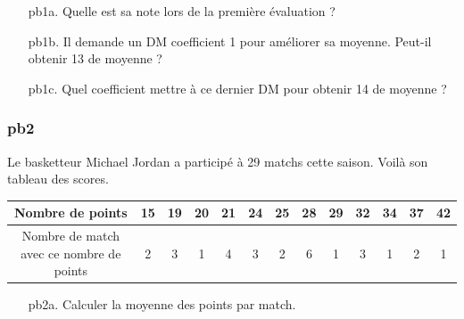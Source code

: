 \begin{enumerate}
  \item[pb1a.] Quelle est sa note lors de la première évaluation ? 
  \item[pb1b.] Il demande un DM coefficient 1 pour améliorer sa moyenne. Peut-il obtenir 13 de moyenne ?
  \item[pb1c.] Quel coefficient mettre à ce dernier DM pour obtenir 14 de moyenne ?
\end{enumerate}

\Pointilles[8]

\subsubsection*{pb2}

Le basketteur Michael Jordan a participé à 29 matchs cette saison. Voilà son tableau des scores.

\begin{tabular}{|c|c|c|c|c|c|c|c|c|c|c|c|c|}
  \hline
  Nombre de points                         & 15 & 19 & 20 & 21 & 24 & 25 & 28 & 29 & 32 & 34 & 37 & 42 \\ \hline

  Nombre de match avec ce nombre de points & 2  & 3  & 1  & 4  &  3 & 2  & 6  & 1  & 3  & 1  & 2  & 1  \\ \hline
\end{tabular}

\begin{enumerate}
  \item[pb2a.] Calculer la moyenne des points par match.
\end{enumerate}

\Pointilles[8]



